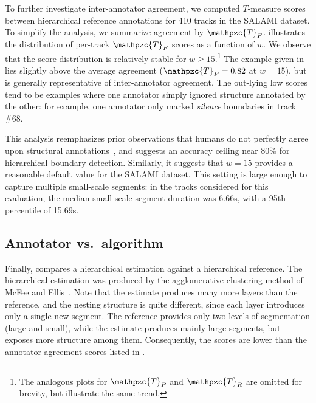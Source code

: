 \documentclass{article}
\def\shag{\ensuremath{\mathpzc{T}}}
\begin{document}
To further investigate inter-annotator agreement, we computed $T$-measure scores between hierarchical
reference annotations for 410 tracks in the SALAMI dataset.  To simplify the analysis, we
summarize agreement by $\shag_F$.  illustrates the distribution of
per-track $\shag_F$ scores as a function of $w$.  We observe that the score distribution is relatively stable
for $w \geq 15$.\footnote{The analogous plots for $\shag_P$ and $\shag_R$ are omitted for brevity, but illustrate the same
trend.} 
The example given in  lies slightly above the average agreement
($\shag_F = 0.82$ at $w=15$),
but is generally representative of inter-annotator agreement.
The out-lying low scores tend to be examples where one annotator simply ignored structure annotated
by the other: for example, one annotator only marked \emph{silence} boundaries in track \#68.

This analysis reemphasizes prior observations that humans do not perfectly agree upon structural
annotations~\cite{Smith2013}, and suggests an accuracy ceiling near 80\% for hierarchical boundary detection.
Similarly, it suggests that $w=15$ provides a reasonable default value for the SALAMI dataset.  This setting
is large enough to capture multiple small-scale segments: in the tracks considered for this evaluation, 
the median small-scale segment duration was 6.66s, with a 95th percentile of 15.69s.

\subsection{Annotator vs.\ algorithm}
Finally,  compares a hierarchical estimation against a hierarchical reference.
The hierarchical estimation was produced by the agglomerative clustering method of McFee and Ellis~\cite{McFee2014}.
Note that the estimate produces many more layers than the reference, and the nesting
structure is quite different, since each layer introduces only a single new segment.
The reference provides only two levels of segmentation (large and small), while the 
estimate produces mainly large segments, but exposes more structure among them.
Consequently, the scores are lower than the annotator-agreement scores listed in
.
\end{document}
